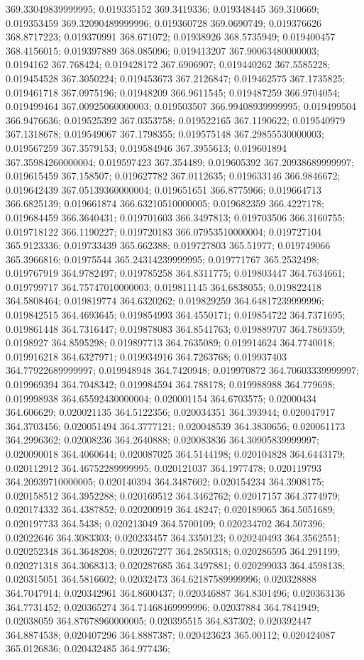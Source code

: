 369.33049839999995; 0.019335152 369.3419336; 0.019348445 369.310669; 0.019353459 369.32090489999996; 0.019360728 369.0690749; 0.019376626 368.8717223; 0.019370991 368.671072; 0.01938926 368.5735949; 0.019400457 368.4156015; 0.019397889 368.085096; 0.019413207 367.90063480000003; 0.0194162 367.768424; 0.019428172 367.6906907; 0.019440262 367.5585228; 0.019454528 367.3050224; 0.019453673 367.2126847; 0.019462575 367.1735825; 0.019461718 367.0975196; 0.01948209 366.9611545; 0.019487259 366.9704054; 0.019499464 367.00925060000003; 0.019503507 366.99408939999995; 0.019499504 366.9476636; 0.019525392 367.0353758; 0.019522165 367.1190622; 0.019540979 367.1318678; 0.019549067 367.1798355; 0.019575148 367.29855530000003; 0.019567259 367.3579153; 0.019584946 367.3955613; 0.019601894 367.35984260000004; 0.019597423 367.354489; 0.019605392 367.20938689999997; 0.019615459 367.158507; 0.019627782 367.0112635; 0.019633146 366.9846672; 0.019642439 367.05139360000004; 0.019651651 366.8775966; 0.019664713 366.6825139; 0.019661874 366.63210510000005; 0.019682359 366.4227178; 0.019684459 366.3640431; 0.019701603 366.3497813; 0.019703506 366.3160755; 0.019718122 366.1190227; 0.019720183 366.07953510000004; 0.019727104 365.9123336; 0.019733439 365.662388; 0.019727803 365.51977; 0.019749066 365.3966816; 0.01975544 365.24314239999995; 0.019771767 365.2532498; 0.019767919 364.9782497; 0.019785258 364.8311775; 0.019803447 364.7634661; 0.019799717 364.75747010000003; 0.019811145 364.6838055; 0.019822418 364.5808464; 0.019819774 364.6320262; 0.019829259 364.64817239999996; 0.019842515 364.4693645; 0.019854993 364.4550171; 0.019854722 364.7371695; 0.019861448 364.7316447; 0.019878083 364.8541763; 0.019889707 364.7869359; 0.0198927 364.8595298; 0.019897713 364.7635089; 0.019914624 364.7740018; 0.019916218 364.6327971; 0.019934916 364.7263768; 0.019937403 364.77922689999997; 0.019948948 364.7420948; 0.019970872 364.70603339999997; 0.019969394 364.7048342; 0.019984594 364.788178; 0.019988988 364.779698; 0.019998938 364.65592430000004; 0.020001154 364.6703575; 0.02000434 364.606629; 0.020021135 364.5122356; 0.020034351 364.393944; 0.020047917 364.3703456; 0.020051494 364.3777121; 0.020048539 364.3830656; 0.020061173 364.2996362; 0.02008236 364.2640888; 0.020083836 364.30905839999997; 0.020090018 364.4060644; 0.020087025 364.5144198; 0.020104828 364.6443179; 0.020112912 364.46752289999995; 0.020121037 364.1977478; 0.020119793 364.20939710000005; 0.020140394 364.3487602; 0.020154234 364.3908175; 0.020158512 364.3952288; 0.020169512 364.3462762; 0.02017157 364.3774979; 0.020174332 364.4387852; 0.020200919 364.48247; 0.020189065 364.5051689; 0.020197733 364.5438; 0.020213049 364.5700109; 0.020234702 364.507396; 0.02022646 364.3083303; 0.020233457 364.3350123; 0.020240493 364.3562551; 0.020252348 364.3648208; 0.020267277 364.2850318; 0.020286595 364.291199; 0.020271318 364.3068313; 0.020287685 364.3497881; 0.020299033 364.4598138; 0.020315051 364.5816602; 0.02032473 364.62187589999996; 0.020328888 364.7047914; 0.020342961 364.8600437; 0.020346887 364.8301496; 0.020363136 364.7731452; 0.020365274 364.71468469999996; 0.02037884 364.7841949; 0.02038059 364.87678960000005; 0.020395515 364.837302; 0.020392447 364.8874538; 0.020407296 364.8887387; 0.020423623 365.00112; 0.020424087 365.0126836; 0.020432485 364.977436; 